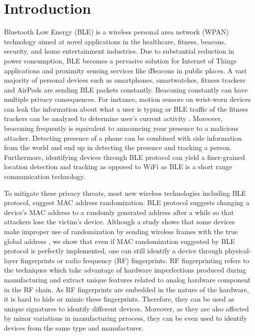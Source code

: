 \section{Introduction}
\label{sec:intro}

Bluetooth Low Energy (BLE) is a wireless personal area network (WPAN) technology aimed at novel applications in the healthcare, fitness, beacons, security, and home entertainment industries. Due to substantial reduction in power consumption, BLE becomes a pervasive solution for Internet of Things applications and proximity sensing services like iBeacons in public places. A vast majority of personal devices such as smartphones, smartwatches, fitness trackers and AirPods are sending BLE packets constantly. Beaconing constantly can have multiple privacy consequences. For instance, motion sensors on wrist-worn devices can leak the information about what a user is typing \cite{mole_wang} or BLE traffic of the fitness trackers can be analyzed to determine user’s current activity \cite{mole_wang,fitnesstrackers_pathak}. Moreover, beaconing frequently is equivalent to announcing your presence to a malicious attacker. Detecting presence of a phone can be combined with side information from the world and end up in detecting the presence and tracking a person. Furthermore, identifying devices through BLE protocol can yield a finer-grained location detection and tracking as opposed to WiFi as BLE is a short range communication technology.

To mitigate these privacy threats, most new wireless technologies including BLE protocol, suggest MAC address randomization. BLE protocol suggests changing a device's MAC address to a randomly generated address after a while so that attackers lose the victim's device. Although a study shows that some devices make improper use of randomization by sending wireless frames with the true global address \cite{MACRandomizationfail_Martin}, we show that even if MAC randomization suggested by BLE protocol is perfectly implemented, one can still identify a device through physical-layer fingerprints or radio frequency (RF) fingerprints. RF fingerprinting refers to the techniques which take advantage of hardware imperfections produced during manufacturing and extract unique features related to analog hardware component in the RF chain. As RF fingerprints are embedded in the nature of the hardware, it is hard to hide or mimic these fingerprints. Therefore, they can be used as unique signatures to identify different devices. Moreover, as they are also affected by minor variations in manufacturing prrocess, they can be  even used to identify devices from the same type and manufacturer.

